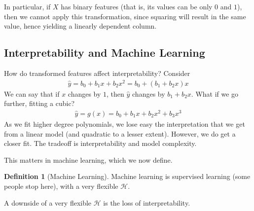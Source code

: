 \documentclass[12pt, a4paper]{article}
\theoremstyle{definition}
\newtheorem*{definition}{Definition}
\begin{document}
	In particular, if $X$ has binary features (that is, its values can be only $0$
	and $1$), then we cannot apply this transformation, since squaring will result
	in the same value, hence yielding a linearly dependent column.
	\subsection*{Interpretability and Machine Learning}
	How do transformed features affect interpretability? Consider
	\begin{align*}
		\hat{y} = b_0 + b_1x + b_2x^2 = b_0 + (b_1 + b_2x)x
	\end{align*}
	We can say that if $x$ changes by $1$, then $\hat{y}$ changes by $b_1+b_2x$.
	What if we go further, fitting a cubic?
	\begin{align*}
		\hat{y} = g(x) = b_0 + b_1x + b_2x^2 + b_3x^3
	\end{align*}
	As we fit higher degree polynomials, we lose easy the interpretation
	that we get from a linear model (and quadratic to a lesser extent).
	However, we do get a closer fit. The tradeoff is interpretability and
	model complexity.
	
	This matters in machine learning, which we now define.
	\begin{tcolorbox}[breakable]
		\begin{definition}[Machine Learning]
			Machine learning is supervised learning (some people stop here),
			with a very flexible $\mathcal{H}$.
		\end{definition}
	\end{tcolorbox}
	A downside of a very flexible $\mathcal{H}$ is the loss of interpretability.
\end{document}
